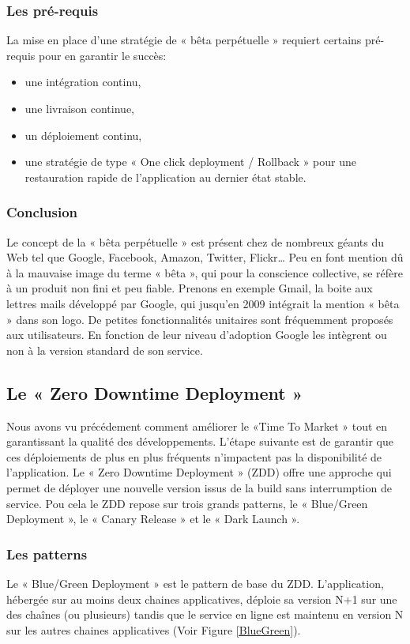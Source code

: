 \documentclass{report}
\begin{document}
        \subsubsection{Les pré-requis}
        La mise en place d’une stratégie de « bêta perpétuelle » requiert certains pré-requis pour en garantir le succès:\\
        \begin{itemize}
          \item une intégration continu,
          \item une livraison continue,
          \item un déploiement continu,
          \item une stratégie de type « One click deployment / Rollback » pour une restauration rapide de l’application au dernier état stable.\\
        \end{itemize}

        \subsubsection{Conclusion}
        Le concept de la « bêta perpétuelle » est présent chez de nombreux géants du Web tel que Google, Facebook, Amazon, Twitter, Flickr… Peu en font mention dû à la mauvaise image du terme « bêta », qui pour la conscience collective, se réfère à un produit non fini et peu fiable. Prenons en exemple Gmail, la boite aux lettres mails développé par Google, qui jusqu’en 2009 intégrait la mention « bêta » dans son logo. De petites fonctionnalités unitaires sont fréquemment proposés aux utilisateurs. En fonction de leur niveau d’adoption Google les intègrent ou non à la version standard de son service.

        \subsection{Le « Zero Downtime Deployment »}
        Nous avons vu précédement comment améliorer le «Time To Market » tout en garantissant la qualité des développements. L'étape suivante est de garantir que ces déploiements de plus en plus fréquents n'impactent pas la disponibilité de l'application. Le « Zero Downtime Deployment » (ZDD) offre une approche qui permet de déployer une nouvelle version issus de la build sans interrumption de service. Pou cela le ZDD repose sur trois grands patterns, le « Blue/Green Deployment », le « Canary Release » et le « Dark Launch ».
          \subsubsection{Les patterns}
          Le « Blue/Green Deployment » est le pattern de base du ZDD. L’application, hébergée sur au moins deux chaines applicatives, déploie sa version N+1 sur une des chaînes (ou plusieurs) tandis que le service en ligne est maintenu en version N sur les autres chaines applicatives (Voir Figure \ref{BlueGreen}).\\
\end{document}
